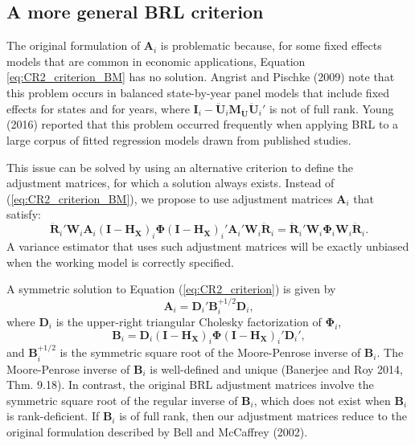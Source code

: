 \documentclass[12pt]{article}
\begin{document}
\hypertarget{a-more-general-brl-criterion}{%
\subsection{A more general BRL
criterion}\label{a-more-general-brl-criterion}}

The original formulation of \(\mathbf{A}_i\) is problematic because, for
some fixed effects models that are common in economic applications,
Equation \ref{eq:CR2_criterion_BM} has no solution. Angrist and Pischke
(2009) note that this problem occurs in balanced state-by-year panel
models that include fixed effects for states and for years, where
\(\mathbf{I}_i - \mathbf{\ddot{U}}_i \mathbf{M_{\ddot{U}}} \mathbf{\ddot{U}}_i'\)
is not of full rank. Young (2016) reported that this problem occurred
frequently when applying BRL to a large corpus of fitted regression
models drawn from published studies.

This issue can be solved by using an alternative criterion to define the
adjustment matrices, for which a solution always exists. Instead of
(\ref{eq:CR2_criterion_BM}), we propose to use adjustment matrices
\(\mathbf{A}_i\) that satisfy: \begin{equation}
\label{eq:CR2_criterion}
\mathbf{\ddot{R}}_i' \mathbf{W}_i \mathbf{A}_i \left(\mathbf{I} - \mathbf{H_X}\right)_i \boldsymbol\Phi \left(\mathbf{I} - \mathbf{H_X}\right)_i' \mathbf{A}_i' \mathbf{W}_i \mathbf{\ddot{R}}_i = \mathbf{\ddot{R}}_i' \mathbf{W}_i \boldsymbol\Phi_i \mathbf{W}_i \mathbf{\ddot{R}}_i.
\end{equation} A variance estimator that uses such adjustment matrices
will be exactly unbiased when the working model is correctly specified.

A symmetric solution to Equation (\ref{eq:CR2_criterion}) is given by
\begin{equation}
\label{eq:CR2_adjustment}
\mathbf{A}_i = \mathbf{D}_i' \mathbf{B}_i^{+1/2} \mathbf{D}_i,
\end{equation} where \(\mathbf{D}_i\) is the upper-right triangular
Cholesky factorization of \(\boldsymbol\Phi_i\), \begin{equation}
\label{eq:CR2_Bmatrix}
\mathbf{B}_i = \mathbf{D}_i\left(\mathbf{I} - \mathbf{H_X}\right)_i \boldsymbol\Phi \left(\mathbf{I} - \mathbf{H_X}\right)_i' \mathbf{D}_i',
\end{equation} and \(\mathbf{B}_i^{+1/2}\) is the symmetric square root
of the Moore-Penrose inverse of \(\mathbf{B}_i\). The Moore-Penrose
inverse of \(\mathbf{B}_i\) is well-defined and unique (Banerjee and Roy
2014, Thm. 9.18). In contrast, the original BRL adjustment matrices
involve the symmetric square root of the regular inverse of
\(\mathbf{B}_i\), which does not exist when \(\mathbf{B}_i\) is
rank-deficient. If \(\mathbf{B}_i\) is of full rank, then our adjustment
matrices reduce to the original formulation described by Bell and
McCaffrey (2002).
\end{document}
